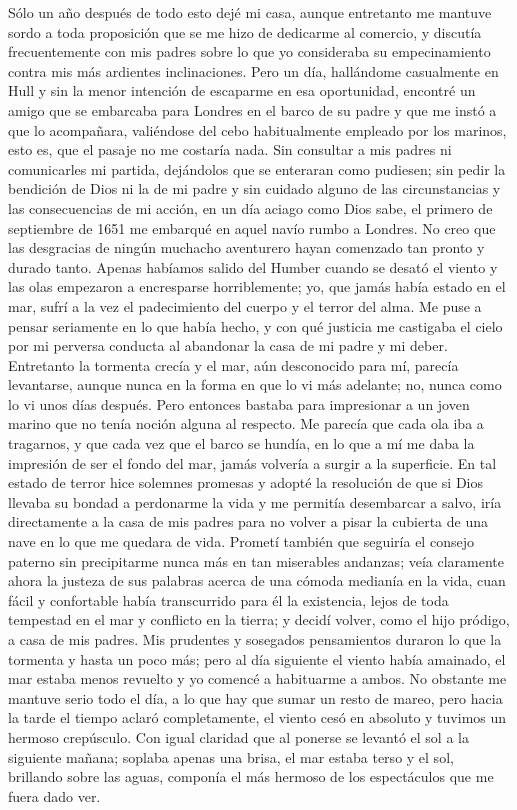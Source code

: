 \documentclass{novela}
\begin{document}
    Sólo un año después de todo esto dejé mi casa, aunque entretanto me mantuve sordo a toda proposición que se me hizo de dedicarme al comercio, y discutía frecuentemente con mis padres sobre lo que yo consideraba su empecinamiento contra mis más ardientes inclinaciones. Pero un día, hallándome casualmente en Hull y sin la menor intención de escaparme en esa oportunidad, encontré un amigo que se embarcaba para Londres en el barco de su padre y que me instó a que lo acompañara, valiéndose del cebo habitualmente empleado por los marinos, esto es, que el pasaje no me costaría nada. Sin consultar a mis padres ni comunicarles mi partida, dejándolos que se enteraran como pudiesen; sin pedir la bendición de Dios ni la de mi padre y sin cuidado alguno de las circunstancias y las consecuencias de mi acción, en un día aciago como Dios sabe, el primero de septiembre de 1651 me embarqué en aquel navío rumbo a Londres. No creo que las desgracias de ningún muchacho aventurero hayan comenzado tan pronto y durado tanto. Apenas habíamos salido del Humber cuando se desató el viento y las olas empezaron a encresparse horriblemente; yo, que jamás había estado en el mar, sufrí a la vez el padecimiento del cuerpo y el terror del alma. Me puse a pensar seriamente en lo que había hecho, y con qué justicia me castigaba el cielo por mi perversa conducta al abandonar la casa de mi padre y mi deber.
    Entretanto la tormenta crecía y el mar, aún desconocido para mí, parecía levantarse, aunque nunca en la forma en que lo vi más adelante; no, nunca como lo vi unos días después. Pero entonces bastaba para impresionar a un joven marino que no tenía noción alguna al respecto. Me parecía que cada ola iba a tragarnos, y que cada vez que el barco se hundía, en lo que a mí me daba la impresión de ser el fondo del mar, jamás volvería a surgir a la superficie. En tal estado de terror hice solemnes promesas y adopté la resolución de que si Dios llevaba su bondad a perdonarme la vida y me permitía desembarcar a salvo, iría directamente a la casa de mis padres para no volver a pisar la cubierta de una nave en lo que me quedara de vida. Prometí también que seguiría el consejo paterno sin precipitarme nunca más en tan miserables andanzas; veía claramente ahora la justeza de sus palabras acerca de una cómoda medianía en la vida, cuan fácil y confortable había transcurrido para él la existencia, lejos de toda tempestad en el mar y conflicto en la tierra; y decidí volver, como el hijo pródigo, a casa de mis padres.
    Mis prudentes y sosegados pensamientos duraron lo que la tormenta y hasta un poco más; pero al día siguiente el viento había amainado, el mar estaba menos revuelto y yo comencé a habituarme a ambos. No obstante me mantuve serio todo el día, a lo que hay que sumar un resto de mareo, pero hacia la tarde el tiempo aclaró completamente, el viento cesó en absoluto y tuvimos un hermoso crepúsculo. Con igual claridad que al ponerse se levantó el sol a la siguiente mañana; soplaba apenas una brisa, el mar estaba terso y el sol, brillando sobre las aguas, componía el más hermoso de los espectáculos que me fuera dado ver.
\end{document}
